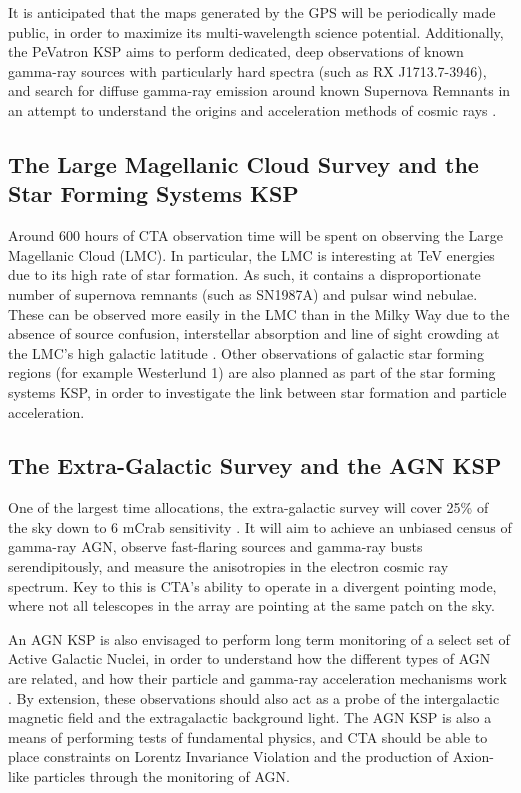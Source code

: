 It is anticipated that the maps generated by the GPS will be periodically made public, in order to maximize its multi-wavelength science potential.
Additionally, the PeVatron KSP aims to perform dedicated, deep observations of known gamma-ray sources with particularly hard spectra (such as RX J1713.7-3946), and search for diffuse gamma-ray emission around known Supernova Remnants in an attempt to understand the origins and acceleration methods of cosmic rays \cite{scienceCTA}.

\subsection{The Large Magellanic Cloud Survey and the Star Forming Systems KSP} Around 600 hours of CTA observation time will be spent on observing the Large Magellanic Cloud (LMC). In particular, the LMC is interesting at TeV energies due to its high rate of star formation. %
As such, it contains a disproportionate number of supernova remnants (such as SN1987A) and pulsar wind nebulae.  These can be observed more easily in the LMC than in the Milky Way due to the absence of source confusion, interstellar absorption and line of sight crowding at the LMC's high galactic latitude \cite{scienceCTA}. Other observations of galactic star forming regions (for example Westerlund 1) are also planned as part of the star forming systems KSP, in order to investigate the link between star formation and particle acceleration.

\subsection{The Extra-Galactic Survey and the AGN KSP} One of the largest time allocations, the extra-galactic survey will cover 25\% of the sky down to 6 mCrab sensitivity \cite{scienceCTA}. It will aim to achieve an unbiased census of gamma-ray AGN, observe fast-flaring sources and gamma-ray busts serendipitously, and measure the anisotropies in the electron cosmic ray spectrum. Key to this is CTA's ability to operate in a divergent pointing mode, where not all telescopes in the array are pointing at the same patch on the sky. 

An AGN KSP is also envisaged to perform long term monitoring of a select set of Active Galactic Nuclei, in order to understand how the different types of AGN are related, and how their particle and gamma-ray acceleration mechanisms work \cite{scienceCTA}. By extension, these observations should also act as a probe of the intergalactic magnetic field and the extragalactic background light. The AGN KSP is also a means of performing tests of fundamental physics, and CTA should be able to place constraints on Lorentz Invariance Violation and the production of Axion-like particles through the monitoring of AGN. 

